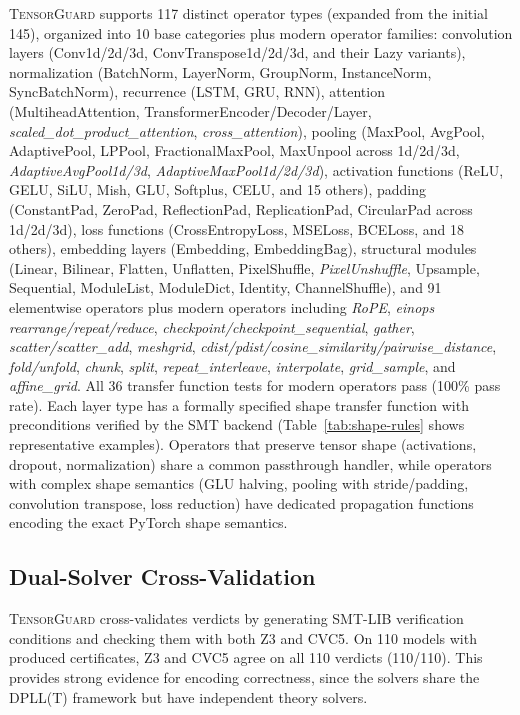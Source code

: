 \documentclass[11pt]{article}
\begin{document}
\textsc{TensorGuard} supports 117 distinct operator types
(expanded from the initial 145),
organized into 10 base categories plus modern operator families:
convolution layers (Conv1d/2d/3d, ConvTranspose1d/2d/3d, and their Lazy variants),
normalization (BatchNorm, LayerNorm, GroupNorm, InstanceNorm, SyncBatchNorm),
recurrence (LSTM, GRU, RNN),
attention (MultiheadAttention, TransformerEncoder/Decoder/Layer,
\emph{scaled\_dot\_product\_attention}, \emph{cross\_attention}),
pooling (MaxPool, AvgPool, AdaptivePool, LPPool, FractionalMaxPool, MaxUnpool across 1d/2d/3d,
\emph{AdaptiveAvgPool1d/3d}, \emph{AdaptiveMaxPool1d/2d/3d}),
activation functions (ReLU, GELU, SiLU, Mish, GLU, Softplus, CELU, and 15 others),
padding (ConstantPad, ZeroPad, ReflectionPad, ReplicationPad, CircularPad across 1d/2d/3d),
loss functions (CrossEntropyLoss, MSELoss, BCELoss, and 18 others),
embedding layers (Embedding, EmbeddingBag),
structural modules (Linear, Bilinear, Flatten, Unflatten, PixelShuffle, \emph{PixelUnshuffle},
Upsample, Sequential, ModuleList, ModuleDict, Identity, ChannelShuffle),
and 91 elementwise operators plus modern operators including
\emph{RoPE}, \emph{einops rearrange/repeat/reduce},
\emph{checkpoint/checkpoint\_sequential},
\emph{gather}, \emph{scatter/scatter\_add}, \emph{meshgrid},
\emph{cdist/pdist/cosine\_similarity/pairwise\_distance},
\emph{fold/unfold}, \emph{chunk}, \emph{split},
\emph{repeat\_interleave}, \emph{interpolate}, \emph{grid\_sample},
and \emph{affine\_grid}.
All 36 transfer function tests for modern operators pass (100\% pass rate).
Each layer type has a formally specified shape transfer function
with preconditions verified by the SMT backend (Table~\ref{tab:shape-rules}
shows representative examples).
Operators that preserve tensor shape
(activations, dropout, normalization) share a common passthrough handler,
while operators with complex shape semantics (GLU halving, pooling with
stride/padding, convolution transpose, loss reduction) have dedicated
propagation functions encoding the exact PyTorch shape semantics.

\subsection{Dual-Solver Cross-Validation}

\textsc{TensorGuard} cross-validates verdicts by generating SMT-LIB
verification conditions and checking them with both Z3 and CVC5.
On 110 models with produced certificates, Z3 and CVC5 agree on
all 110 verdicts (110/110).  This provides strong evidence for
encoding correctness, since the solvers share the DPLL(T) framework
but have independent theory solvers.
\end{document}
